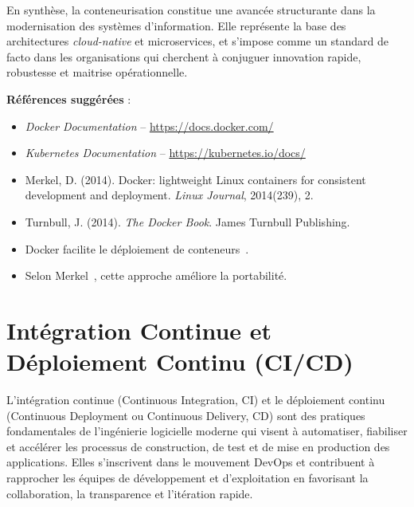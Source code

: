 En synthèse, la conteneurisation constitue une avancée structurante dans la modernisation des systèmes d’information. Elle représente la base des architectures \textit{cloud-native} et microservices, et s’impose comme un standard de facto dans les organisations qui cherchent à conjuguer innovation rapide, robustesse et maitrise opérationnelle.

\textbf{Références suggérées} :
\begin{itemize}
	\item \textit{Docker Documentation} – \url{https://docs.docker.com/}
	\item \textit{Kubernetes Documentation} – \url{https://kubernetes.io/docs/}
	\item Merkel, D. (2014). Docker: lightweight Linux containers for consistent development and deployment. \textit{Linux Journal}, 2014(239), 2.
	\item Turnbull, J. (2014). \textit{The Docker Book}. James Turnbull Publishing.
	\item Docker facilite le déploiement de conteneurs~\cite{docker-docs}.
	\item Selon Merkel~\cite{merkel2014docker}, cette approche améliore la portabilité.
\end{itemize}

\section{Intégration Continue et Déploiement Continu (CI/CD)}

L’intégration continue (Continuous Integration, CI) et le déploiement continu (Continuous Deployment ou Continuous Delivery, CD) sont des pratiques fondamentales de l’ingénierie logicielle moderne qui visent à automatiser, fiabiliser et accélérer les processus de construction, de test et de mise en production des applications. Elles s’inscrivent dans le mouvement DevOps et contribuent à rapprocher les équipes de développement et d’exploitation en favorisant la collaboration, la transparence et l’itération rapide.


